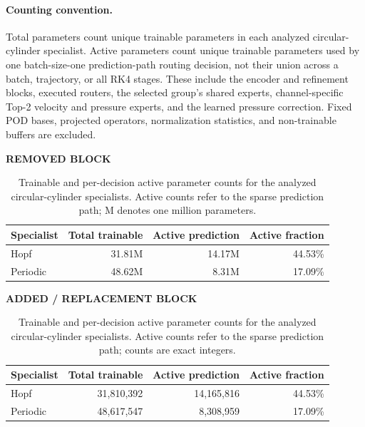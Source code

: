 \documentclass{article}
\providecommand{\DIFaddbegin}{} %
\providecommand{\DIFaddend}{} %
\providecommand{\DIFdelbegin}{} %
\providecommand{\DIFdelend}{} %
\begin{document}
\paragraph{Counting convention.}
Total parameters count unique trainable parameters in each analyzed
circular-cylinder specialist. Active parameters count unique trainable
parameters used by one batch-size-one prediction-path routing decision,
not their union across a batch, trajectory, or all RK4 stages. These include
the encoder and refinement blocks, executed routers, the selected group's
shared experts, channel-specific Top-2 velocity and pressure experts, and
the learned pressure correction. Fixed POD bases, projected operators,
normalization statistics, and non-trainable buffers are excluded.

\par


\DIFdelbegin 
{\color{red}
\begin{table}[H]
\color{red}\noindent\textbf{REMOVED BLOCK}\par
\centering
\caption{Trainable and per-decision active parameter counts for the analyzed
circular-cylinder specialists. Active counts refer to the sparse prediction
path; M denotes one million parameters.}
\label{old:tab:parameter_counts}
\begin{tabular}{lrrr}
\toprule
Specialist & Total trainable & Active prediction & Active fraction \\
\midrule
Hopf & 31.81M & 14.17M & 44.53\% \\
Periodic & 48.62M & 8.31M & 17.09\% \\
\bottomrule
\end{tabular}
\end{table}
}
\DIFdelend \DIFaddbegin 
{\color{blue}
\begin{table}[H]
\color{blue}\noindent\textbf{ADDED / REPLACEMENT BLOCK}\par
\centering
\caption{Trainable and per-decision active parameter counts for the analyzed
circular-cylinder specialists. Active counts refer to the sparse prediction
path; counts are exact integers.}
\label{tab:parameter_counts}
\begin{tabular}{lrrr}
\toprule
Specialist & Total trainable & Active prediction & Active fraction \\
\midrule
Hopf & 31,810,392 & 14,165,816 & 44.53\% \\
Periodic & 48,617,547 & 8,308,959 & 17.09\% \\
\bottomrule
\end{tabular}
\end{table}
}
\DIFaddend 
\end{document}
